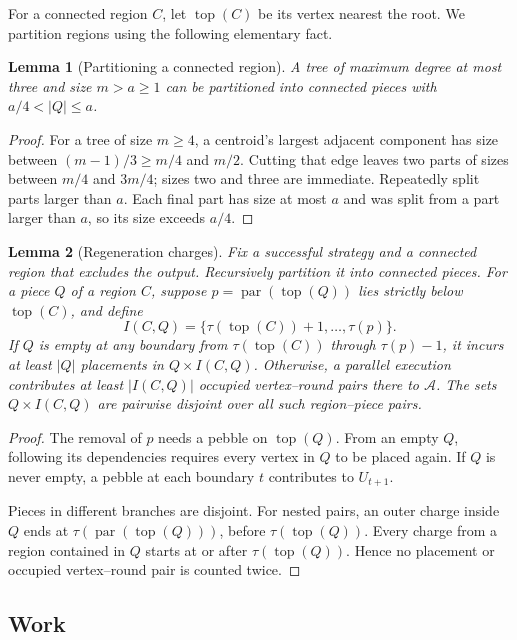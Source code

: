\documentclass[11pt]{article}
\newtheorem{lemma}[lemma]{Lemma}
\theoremstyle{definition}
\theoremstyle{remark}
\DeclareMathOperator{\parv}{par}
\DeclareMathOperator{\topv}{top}
\newcommand{\Area}{\mathcal A}
\begin{document}
For a connected region $C$, let $\topv(C)$ be its vertex nearest the root. We partition regions using the following elementary fact.

\begin{lemma}[Partitioning a connected region]
\label{lem:partition}
A tree of maximum degree at most three and size $m>a\ge1$ can be partitioned into connected pieces with $a/4<|Q|\le a$.
\end{lemma}
\begin{proof}
For a tree of size $m\ge4$, a centroid's largest adjacent component has size between $(m-1)/3\ge m/4$ and $m/2$. Cutting that edge leaves two parts of sizes between $m/4$ and $3m/4$; sizes two and three are immediate. Repeatedly split parts larger than $a$. Each final part has size at most $a$ and was split from a part larger than $a$, so its size exceeds $a/4$.
\end{proof}

\begin{lemma}[Regeneration charges]
\label{lem:charging}
Fix a successful strategy and a connected region that excludes the output. Recursively partition it into connected pieces. For a piece $Q$ of a region $C$, suppose $p=\parv(\topv(Q))$ lies strictly below $\topv(C)$, and define
\begin{equation}
 I(C,Q)=\{\tau(\topv(C))+1,\ldots,\tau(p)\}.
 \label{eq:charge-interval}
\end{equation}
If $Q$ is empty at any boundary from $\tau(\topv(C))$ through $\tau(p)-1$, it incurs at least $|Q|$ placements in $Q\times I(C,Q)$. Otherwise, a parallel execution contributes at least $|I(C,Q)|$ occupied vertex--round pairs there to $\Area$. The sets $Q\times I(C,Q)$ are pairwise disjoint over all such region--piece pairs.
\end{lemma}
\begin{proof}
The removal of $p$ needs a pebble on $\topv(Q)$. From an empty $Q$, following its dependencies requires every vertex in $Q$ to be placed again. If $Q$ is never empty, a pebble at each boundary $t$ contributes to $U_{t+1}$.

Pieces in different branches are disjoint. For nested pairs, an outer charge inside $Q$ ends at $\tau(\parv(\topv(Q)))$, before $\tau(\topv(Q))$. Every charge from a region contained in $Q$ starts at or after $\tau(\topv(Q))$. Hence no placement or occupied vertex--round pair is counted twice.
\end{proof}

\subsection{Work}
\end{document}
